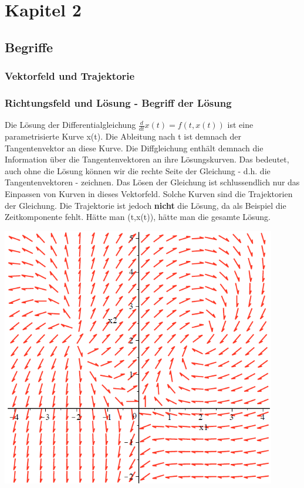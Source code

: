 \section{Kapitel 2}

\subsection{Begriffe}
\subsubsection{Vektorfeld und Trajektorie}




\subsubsection{Richtungsfeld und Lösung - Begriff der Lösung}
Die Lösung der Differentialgleichung $\frac{d}{dt}x(t) = f(t,x(t))$ ist eine parametrisierte Kurve x(t). Die Ableitung nach t ist demnach der Tangentenvektor an diese Kurve. Die Diffgleichung enthält demnach die Information über die Tangentenvektoren an ihre Lösungskurven. 
Das bedeutet, auch ohne die Lösung können wir die rechte Seite der Gleichung - d.h. die Tangentenvektoren - zeichnen. Das Lösen der Gleichung ist schlussendlich nur das Einpassen von Kurven in dieses Vektorfeld. Solche Kurven sind die Trajektorien der Gleichung. Die Trajektorie ist jedoch \textbf{nicht} die Lösung, da als Beispiel die Zeitkomponente fehlt. Hätte man (t,x(t)), hätte man die gesamte Lösung. 
\begin{minipage}[h]{0.35\textwidth} 
	\includegraphics[width=0.9\textwidth]{images/Vektorfeld.png}
\end{minipage}
